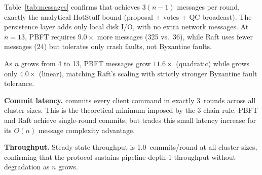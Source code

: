 \noindent Table~\ref{tab:messages} confirms that \persisthotstuff{} achieves $3(n{-}1)$
messages per round, exactly the analytical HotStuff bound (proposal + votes + QC
broadcast).  The persistence layer adds only local disk I/O, with no extra network
messages.  At $n{=}13$, PBFT requires $9.0\times$ more messages (325 vs.\ 36), while Raft
uses fewer messages (24) but tolerates only crash faults, not Byzantine faults.

\noindent As $n$ grows from 4 to 13, PBFT messages grow $11.6\times$ (quadratic) while
\persisthotstuff{} grows only $4.0\times$ (linear), matching Raft's scaling with strictly
stronger Byzantine fault tolerance.

\smallskip\noindent\textbf{Commit latency.}\quad
\persisthotstuff{} commits every client command in exactly 3~rounds across all cluster
sizes.  This is the theoretical minimum imposed by the 3-chain rule.  PBFT and Raft achieve
single-round commits, but \persisthotstuff{} trades this small latency increase for its
$O(n)$ message complexity advantage.

\smallskip\noindent\textbf{Throughput.}\quad
Steady-state throughput is 1.0~commits/round at all cluster sizes, confirming that the
protocol sustains pipeline-depth-1 throughput without degradation as $n$ grows.
